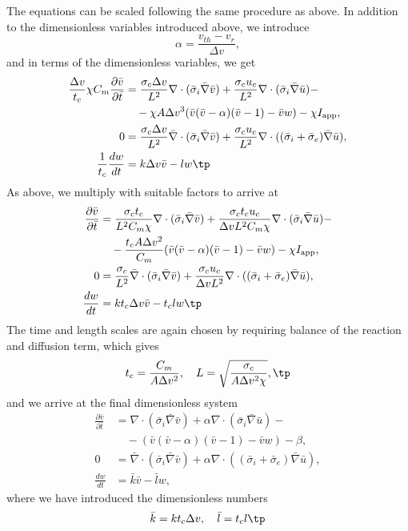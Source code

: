 \documentclass[graybox,envcountchap,sectrefs,final]{svmonodo}
\begin{document}
The equations can be scaled following the same procedure as above. In
addition to the dimensionless variables introduced above, we introduce
\[
\alpha = \frac{v_{th}-v_r}{\Delta v} ,
\]
and in terms of the dimensionless variables, we get
\begin{align*}
\frac{\Delta v}{t_c}\chi C_m\frac{\partial \bar v}{\partial \bar t} &=
\frac{\sigma_c\Delta v }{L^2}\nabla\cdot( \bar \sigma_i\bar\nabla\bar v) +
\frac{\sigma_c u_c}{L^2}\nabla\cdot (\bar \sigma_i\bar \nabla \bar u) -\\ 
&\quad - \chi A\Delta v^3 (\bar v (\bar  v-\alpha)(\bar v -1) -
\bar v w) -\chi I_{\rm{app}},
\\ 
0 &= \frac{\sigma_c\Delta v }{L^2}\bar \nabla\cdot( \bar \sigma_i\bar
\nabla \bar v) 
+ \frac{\sigma_cu_c}{L^2}\nabla\cdot ((\bar \sigma_i + \bar \sigma_e)\bar \nabla \bar u),\\ 
\frac{1}{t_c} \frac{dw}{dt} &= k \Delta v \bar v
-l w \tp
\end{align*}
As above, we multiply with suitable factors to arrive at
\begin{align*}
\frac{\partial \bar v}{\partial \bar t} &=
\frac{\sigma_c t_c}{L^2 C_m \chi}\nabla\cdot( \bar \sigma_i\bar\nabla\bar v) +
\frac{\sigma_c t_c u_c}{\Delta v L^2 C_m \chi}\nabla\cdot (\bar \sigma_i\bar \nabla \bar u) -\\ 
&\quad - \frac{t_c A\Delta v^2}{C_m} (\bar v (\bar v-\alpha)(\bar v -1) - \bar v
w) -\chi I_{\rm{app}}, \\ 
0 &= \frac{\sigma_c}{L^2}\bar \nabla\cdot( \bar \sigma_i\bar
\nabla \bar v) 
+ \frac{\sigma_cu_c}{\Delta v L^2}\nabla\cdot ((\bar \sigma_i + \bar \sigma_e)\bar \nabla \bar u),\\ 
\frac{dw}{dt}&= k {t_c}{\Delta v} \bar
v -t_c l w \tp
\end{align*}
The time and length scales are again chosen by requiring balance of
the reaction and diffusion term, which gives
\[ t_c = \frac{C_m}{A \Delta v^2},\quad L = \sqrt{\frac{\sigma_c}{A
\Delta v^2 \chi}},\tp\]
 and we arrive at the final dimensionless system
\begin{align*}
\frac{\partial \bar v}{\partial \bar t} &=
\nabla\cdot( \bar \sigma_i\bar\nabla\bar v) +
\alpha \nabla\cdot (\bar \sigma_i\bar \nabla \bar u) -\\ 
&\quad - (\bar v (\bar v-\alpha)(\bar v -1) - \bar v
w) -\beta, \\ 
0 &= \bar \nabla\cdot( \bar \sigma_i\bar
\nabla \bar v) 
+ \alpha \nabla\cdot ((\bar \sigma_i + \bar \sigma_e)\bar \nabla \bar u),\\ 
\frac{dw}{dt}&= \bar k \bar
v -\bar l w ,
\end{align*}
where we have introduced the dimensionless numbers
\[
\bar k = k {t_c}{\Delta v} , \quad \bar l = t_c l \tp
\]
\end{document}
